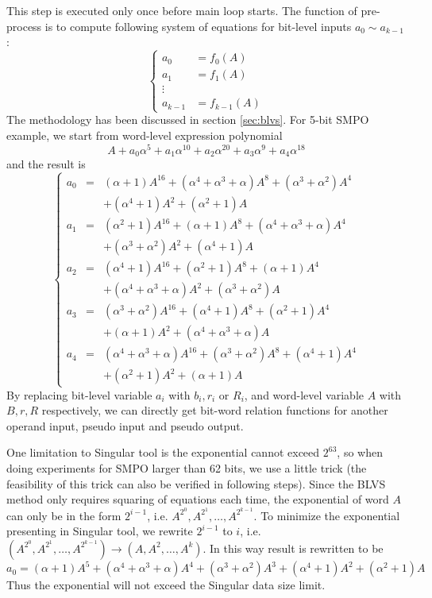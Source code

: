 This step is executed only once before main loop starts. The function of pre-process is to compute following system
of equations for bit-level inputs $a_0 \sim a_{k-1}$:
\begin{displaymath}
\left\{
  \begin{array}{ll}
  a_0 & = f_0(A)\\
  a_1 & = f_1(A)\\
  \vdots & \ \\
  a_{k-1} & = f_{k-1}(A)
  \end{array} \right.
\end{displaymath}
The methodology has been discussed in section \ref{sec:blvs}. For 5-bit SMPO example, we start from word-level
expression polynomial
\begin{displaymath}
A + a_0\alpha^5+a_1\alpha^{10}+a_2\alpha^{20}+a_3\alpha^9+a_4\alpha^{18}
\end{displaymath}
and the result is
\begin{displaymath}
\left\{
  \begin{array}{lcl}
  a_0 & = & (\alpha+1)A^{16}+(\alpha^4+\alpha^3+\alpha)A^8+(\alpha^3+\alpha^2)A^4\\&&+(\alpha^4+1)A^2+(\alpha^2+1)A\\
  a_1 & = & (\alpha^2+1)A^{16}+(\alpha+1)A^8+(\alpha^4+\alpha^3+\alpha)A^4\\&&+(\alpha^3+\alpha^2)A^2+(\alpha^4+1)A\\
  a_2 & = & (\alpha^4+1)A^{16}+(\alpha^2+1)A^8+(\alpha+1)A^4\\&&+(\alpha^4+\alpha^3+\alpha)A^2+(\alpha^3+\alpha^2)A\\
  a_3 & = & (\alpha^3+\alpha^2)A^{16}+(\alpha^4+1)A^8+(\alpha^2+1)A^4\\&&+(\alpha+1)A^2+(\alpha^4+\alpha^3+\alpha)A\\
  a_4 & = & (\alpha^4+\alpha^3+\alpha)A^{16}+(\alpha^3+\alpha^2)A^8+(\alpha^4+1)A^4\\&&+(\alpha^2+1)A^2+(\alpha+1)A
  \end{array} \right.
\end{displaymath}
By replacing bit-level variable $a_i$ with $b_i, r_i$ or $R_i$, and word-level variable $A$ with $B, r, R$ respectively,
we can directly get bit-word relation functions for another operand input, pseudo input and pseudo output.

One limitation to Singular tool is the exponential cannot exceed $2^{63}$, so when doing experiments for SMPO larger than
62 bits, we use a little trick (the feasibility of this trick can also be verified in following steps). Since the BLVS method
only requires squaring of equations each time, the exponential of word $A$ can only be in the form $2^{i-1}$, i.e. 
$A^{2^0},A^{2^1},\dots,A^{2^{k-1}}$. To minimize the exponential presenting in Singular tool, we rewrite $2^{i-1}$ to $i$, i.e.
$(A^{2^0},A^{2^1},\dots,A^{2^{k-1}}) \to (A, A^2, \dots, A^k)$. In this way result is rewritten to be
$$a_0 = (\alpha+1)A^5+(\alpha^4+\alpha^3+\alpha)A^4+(\alpha^3+\alpha^2)A^3+(\alpha^4+1)A^2+(\alpha^2+1)A$$
Thus the exponential will not exceed the Singular data size limit.

